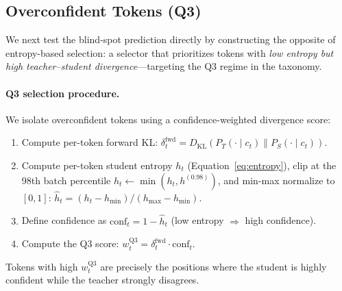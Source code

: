 \documentclass{article}
\newcommand{\KL}{\mathrm{KL}}
\begin{document}
\subsection{Overconfident Tokens (Q3)}
\label{sec:q3_signal}

We next test the blind-spot prediction directly by constructing the opposite of entropy-based selection: a selector that prioritizes tokens with \emph{low entropy but high teacher--student divergence}---targeting the Q3 regime in the taxonomy.

\paragraph{Q3 selection procedure.}
We isolate overconfident tokens using a confidence-weighted divergence score:
\begin{enumerate}
    \item Compute per-token forward KL: $\delta_t^{\mathrm{fwd}} = D_{\KL}(P_T(\cdot \mid c_t) \| P_S(\cdot \mid c_t))$.
    \item Compute per-token student entropy $h_t$ (Equation~\ref{eq:entropy}), clip at the 98th batch percentile $h_t \leftarrow \min(h_t, h^{(0.98)})$, and min-max normalize to $[0,1]$: $\hat{h}_t = (h_t - h_{\min}) / (h_{\max} - h_{\min})$.
    \item Define confidence as $\mathrm{conf}_t = 1 - \hat{h}_t$ (low entropy $\Rightarrow$ high confidence).
    \item Compute the Q3 score: $w_t^{\mathrm{Q3}} = \delta_t^{\mathrm{fwd}} \cdot \mathrm{conf}_t$.
\end{enumerate}
Tokens with high $w_t^{\mathrm{Q3}}$ are precisely the positions where the student is highly confident while the teacher strongly disagrees.
\end{document}
